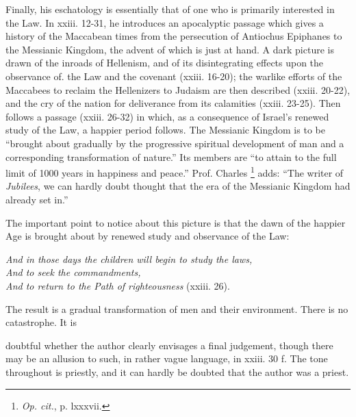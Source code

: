 Finally, his eschatology is essentially that of one who is primarily interested in the Law. In xxiii. 12-31, he introduces an apocalyptic passage which gives a history of the Maccabean times from the persecution of Antiochus Epiphanes to the Messianic Kingdom, the advent of which is just at hand. A dark picture is drawn of the inroads of Hellenism, and of its disintegrating effects upon the observance of. the Law and the covenant (xxiii. 16-20); the warlike efforts of the Maccabees to reclaim the Hellenizers to Judaism are then described (xxiii. 20-22), and the cry of the nation for deliverance from its calamities (xxiii. 23-25). Then follows a passage (xxiii. 26-32) in which, as a consequence of Israel's renewed study of the Law, a happier period follows. The Messianic Kingdom is to be ``brought about gradually by the progressive spiritual development of man and a corresponding transformation of nature.'' Its members are ``to attain to the full limit of 1000 years in happiness and peace.'' Prof. Charles \footnote{\emph{Op. cit.}, p. lxxxvii.} adds: ``The writer of \emph{Jubilees}, we can hardly doubt thought that the era of the Messianic Kingdom had already set in.''

The important point to notice about this picture is that the dawn of the happier Age is brought about by renewed study and observance of the Law:

\emph{And in those days the children will begin to study the laws,\\
And to seek the commandments,\\
And to return to the Path of righteousness} (xxiii. 26).

The result is a gradual transformation of men and their environment. There is no catastrophe. It is

doubtful whether the author clearly envisages a final judgement, though there may be an allusion to such, in rather vague language, in xxiii. 30 f. The tone throughout is priestly, and it can hardly be doubted that the author was a priest.


